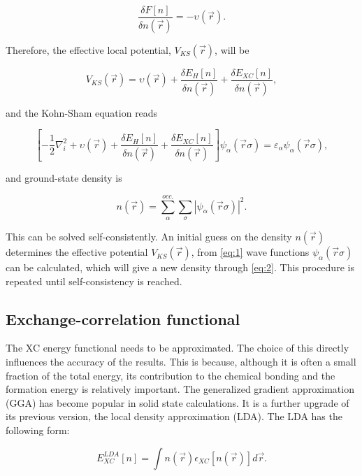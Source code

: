 \begin{equation}
\frac{\delta F[n]}{\delta n(\vec{r})}=-\upsilon(\vec{r}).
\end{equation}

Therefore, the effective local potential, $V_{KS}(\vec{r})$, will be

\begin{equation}
V_{KS}(\vec{r})=\upsilon(\vec{r})+\frac{\delta E_H[n]}{\delta n(\vec{r})}+\frac{\delta E_{XC}[n]}{\delta n(\vec{r})},
\end{equation}

and the Kohn-Sham equation reads

\begin{equation}\label{eq:1}
\left[ -\frac{1}{2}\nabla_i^2+\upsilon(\vec{r})+\frac{\delta E_H[n]}{\delta n(\vec{r})}+\frac{\delta E_{XC}[n]}{\delta n(\vec{r})}\right]\mathit{\psi}_\alpha(\vec{r}\sigma)=\varepsilon_\alpha\mathit{\psi}_\alpha(\vec{r}\sigma),
\end{equation}

and ground-state density is 

\begin{equation}\label{eq:2}
n(\vec{r})=\sum_\alpha^{occ.}\sum_\sigma|\mathit{\psi}_\alpha(\vec{r}\sigma)|^2.
\end{equation}

This can be solved self-consistently. An initial guess on the density $n(\vec{r})$ determines the effective potential $V_{KS}(\vec{r})$, from \autoref{eq:1} wave functions $\mathit{\psi}_\alpha(\vec{r}\sigma)$ can be calculated, which will give a new density through \autoref{eq:2}. This procedure is repeated until self-consistency is reached. 

\subsection{Exchange-correlation functional}

The XC energy functional needs to be approximated. The choice of this directly influences the accuracy of the results. This is because, although it is often a small fraction of the total energy, its contribution to the chemical bonding and the formation energy is relatively important. The generalized gradient approximation (GGA) has become popular in solid state calculations. It is a further upgrade of its previous version, the local density approximation (LDA). The LDA has the following form:

\begin{equation}
E_{XC}^{LDA}[n]=\int n(\vec{r})\epsilon_{XC}[n(\vec{r})]d\vec{r}.
\end{equation}


